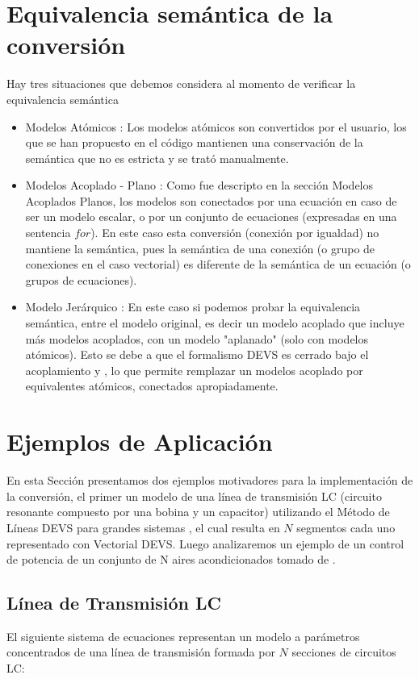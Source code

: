 \documentclass[a4paper,	11pt]{report}
\begin{document}
\section{Equivalencia semántica de la conversión}
Hay tres situaciones que debemos considera al momento de verificar la equivalencia semántica
\begin{itemize}
\item Modelos Atómicos : Los modelos atómicos son convertidos por el usuario, los que se han propuesto en el código mantienen una conservación de la semántica que no es estricta y se trató manualmente. 
\item Modelos Acoplado - Plano : Como fue descripto en la sección Modelos Acoplados Planos, los modelos son conectados por una ecuación en caso de ser un modelo escalar, o por un conjunto de ecuaciones (expresadas en una sentencia $for$). En este caso esta conversión (conexión por igualdad) no mantiene la semántica, pues la semántica de una conexión (o grupo de conexiones en el caso vectorial) es diferente de la semántica de un ecuación (o grupos de ecuaciones).

\item Modelo Jerárquico : En este caso si podemos probar la equivalencia semántica, entre el modelo original, es decir un modelo acoplado que incluye más modelos acoplados, con un modelo "aplanado" (solo con modelos atómicos). Esto se debe a que el formalismo DEVS es cerrado bajo el acoplamiento \cite{Zeigler:2000:TMS:580780} y \cite{zeigler1984multifacetted}, lo que permite remplazar un modelos acoplado por equivalentes atómicos, conectados apropiadamente.
\end{itemize}

\section{Ejemplos de Aplicación}
En esta Sección presentamos dos ejemplos motivadores para la implementación de la conversión, el primer un modelo de una línea de transmisión LC (circuito resonante compuesto por una bobina y un capacitor) utilizando el Método de Líneas DEVS para grandes sistemas \cite{Cel06}, el cual resulta en $N$ segmentos cada uno representado con Vectorial DEVS. Luego analizaremos un ejemplo de un control de potencia de un conjunto de N aires acondicionados tomado de \cite{PKBW12}.

\subsection{Línea de Transmisión LC}
El siguiente sistema de ecuaciones representan un modelo a parámetros concentrados de una línea de transmisión formada por $N$ secciones de circuitos LC:
\end{document}
